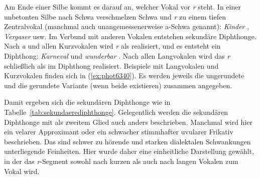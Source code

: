 Am Ende einer Silbe kommt es darauf an, welcher Vokal vor \textit{r} steht.
In einer unbetonten Silbe nach Schwa verschmelzen Schwa und \textit{r} zu einem tiefen Zentralvokal \textipa{[5]} (manchmal auch unangemessenerweise a-Schwa genannt): \textit{Kinder} \textipa{[kInd5]}, \textit{Vergaser} \textipa{[f5ga:z5]} usw.
Im Verbund mit anderen Vokalen entstehen sekundäre Diphthonge.
Nach \textit{a} und allen Kurzvokalen wird \textit{r} als \textipa{[@]} realisiert, und es entsteht ein Diphthong: \textit{Karneval} \textipa{[k\t{a@}n@val]} und \textit{wunderbar} \textipa{[vUnd5b\t{a@}]}.
Nach allen Langvokalen wird das \textit{r} schließlich als \textipa{[5]} im Diphthong realisiert.
Beispiele mit Langvokalen und Kurzvokalen finden sich in (\ref{ex:phot6340}).
Es werden jeweils die ungerundete und die gerundete Variante (wenn beide existieren) zusammen angegeben.

\begin{exe}
  \ex\label{ex:phot6340}
  \begin{xlist}
  \end{xlist}
\end{exe}

Damit ergeben sich die sekundären Diphthonge wie in Tabelle~\ref{tab:sekundaerediphthonge}.
Gelegentlich werden die sekundären Diphthonge mit \textipa{[@]} als zweitem Glied auch anders beschrieben.
Manchmal wird hier ein velarer Approximant \textipa{[\textturnmrleg]} oder ein schwacher stimmhafter uvularer Frikativ \textipa{[\super K]} beschrieben.
Das sind schwer zu hörende und starken dialektalen Schwankungen unterliegende Feinheiten.
Hier wurde daher eine einheitliche Darstellung gewählt, in der das \textit{r}-Segment sowohl nach kurzen als auch nach langen Vokalen zum Vokal wird.

